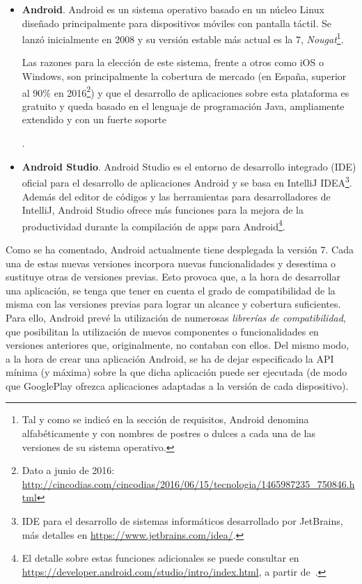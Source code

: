 \begin{itemize}
	\item{\textbf{Android}. Android es un sistema operativo basado en un núcleo Linux diseñado principalmente para dispositivos móviles con pantalla táctil. Se lanzó inicialmente en 2008 y su versión estable más actual es la 7, \textit{Nougat}\footnote{Tal y como se indicó en la sección de requisitos, Android denomina alfabéticamente y con nombres de postres o dulces a cada una de las versiones de su sistema operativo.}.
	
	Las razones para la elección de este sistema, frente a otros como iOS o Windows, son principalmente la cobertura de mercado (en España, superior al 90\% en 2016\footnote{Dato a junio de 2016: \url{http://cincodias.com/cincodias/2016/06/15/tecnologia/1465987235_750846.html}}) y que el desarrollo de aplicaciones sobre esta plataforma es gratuito y queda basado en el lenguaje de programación Java, ampliamente extendido y con un fuerte soporte}.
	
	\item{\textbf{Android Studio}. Android Studio es el entorno de desarrollo integrado (IDE) oficial para el desarrollo de aplicaciones Android y se basa en IntelliJ IDEA\footnote{IDE para el desarrollo de sistemas informáticos desarrollado por JetBrains, más detalles en \url{https://www.jetbrains.com/idea/}.}. Además del editor de códigos y las herramientas para desarrolladores de IntelliJ, Android Studio ofrece más funciones para la mejora de la productividad durante la compilación de apps para Android\footnote{El detalle sobre estas funciones adicionales se puede consultar en \url{https://developer.android.com/studio/intro/index.html}, a partir de~\cite{AnDev}.}}.
\end{itemize}

Como se ha comentado, Android actualmente tiene desplegada la versión 7. Cada una de estas nuevas versiones incorpora nuevas funcionalidades y desestima o sustituye otras de versiones previas. Esto provoca que, a la hora de desarrollar una aplicación, se tenga que tener en cuenta el grado de compatibilidad de la misma con las versiones previas para lograr un alcance y cobertura suficientes. Para ello, Android prevé la utilización de numerosas \emph{librerías de compatibilidad}, que posibilitan la utilización de nuevos componentes o funcionalidades en versiones anteriores que, originalmente, no contaban con ellos. Del mismo modo, a la hora de crear una aplicación Android, se ha de dejar especificado la API mínima (y máxima) sobre la que dicha aplicación puede ser ejecutada (de modo que GooglePlay ofrezca aplicaciones adaptadas a la versión de cada dispositivo).


